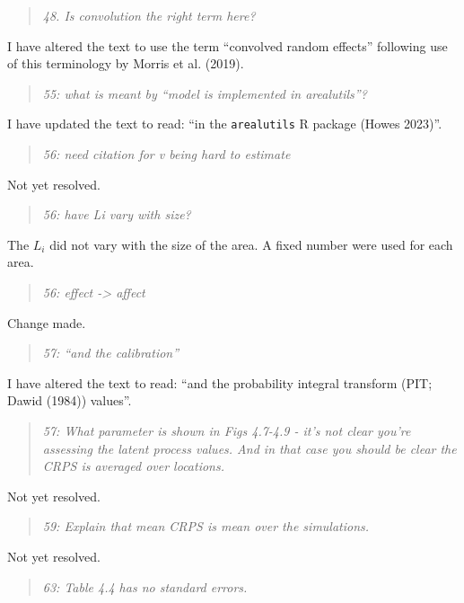 \documentclass[
  12pt,
]{article}
\begin{document}
\begin{quote}
\emph{48. Is convolution the right term here?}
\end{quote}

I have altered the text to use the term ``convolved random effects''
following use of this terminology by Morris et al. (2019).

\begin{quote}
\emph{55: what is meant by ``model is implemented in arealutils''?}
\end{quote}

I have updated the text to read: ``in the \texttt{arealutils} R package
(Howes 2023)''.

\begin{quote}
\emph{56: need citation for v being hard to estimate}
\end{quote}

Not yet resolved.

\begin{quote}
\emph{56: have Li vary with size?}
\end{quote}

The \(L_i\) did not vary with the size of the area. A fixed number were
used for each area.

\begin{quote}
\emph{56: effect -\textgreater{} affect}
\end{quote}

Change made.

\begin{quote}
\emph{57: ``and the calibration''}
\end{quote}

I have altered the text to read: ``and the probability integral
transform (PIT; Dawid (1984)) values''.

\begin{quote}
\emph{57: What parameter is shown in Figs 4.7-4.9 - it's not clear
you're assessing the latent process values. And in that case you should
be clear the CRPS is averaged over locations.}
\end{quote}

Not yet resolved.

\begin{quote}
\emph{59: Explain that mean CRPS is mean over the simulations.}
\end{quote}

Not yet resolved.

\begin{quote}
\emph{63: Table 4.4 has no standard errors.}
\end{quote}
\end{document}
